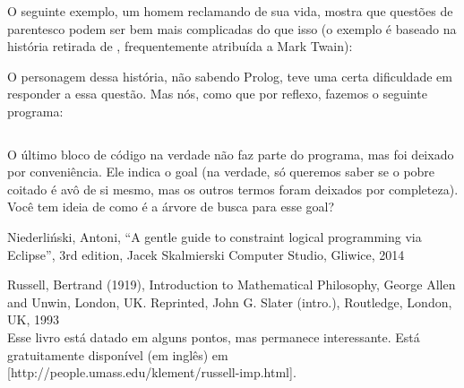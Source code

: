 O seguinte exemplo, um homem reclamando de sua vida, mostra que questões de parentesco podem ser bem
mais complicadas do que isso (o exemplo é baseado na história retirada de \cite{antoni}, frequentemente
atribuída a Mark Twain):


O personagem dessa história, não sabendo Prolog, teve uma certa dificuldade em responder a essa
questão. Mas nós, como que por reflexo, fazemos o seguinte programa:

    \begin{listing}
\inputminted{prolog}{../Exemplos/Cap5/prog1_family.pl}
    \end{listing}

O último bloco de código na verdade não faz parte do programa, mas foi deixado por conveniência. Ele
indica o goal (na verdade, só queremos saber se o pobre coitado é avô de si mesmo, mas os outros
termos foram deixados por completeza). Você tem ideia de como é a árvore de busca para esse goal?



  \begin{thebibliography}{2}

    Niederliński, Antoni,
    ``A gentle guide to constraint logical programming via Eclipse'',
    3rd edition, Jacek Skalmierski Computer Studio, Gliwice, 2014

     Russell, Bertrand (1919), Introduction to Mathematical Philosophy, George Allen and Unwin, London, UK. Reprinted, John G. Slater (intro.), Routledge, London, UK, 1993
    \\Esse livro está datado em alguns pontos, mas permanece interessante. Está gratuitamente disponível (em inglês) em [http://people.umass.edu/klement/russell-imp.html].

  \end{thebibliography}

%
